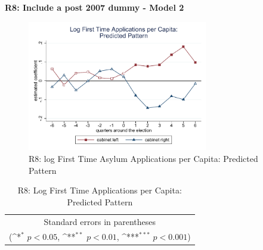 \documentclass[10pt,a4paper]{scrartcl}
\begin{document}
\clearpage
\textbf{R8: Include a post 2007 dummy - Model 2}
\begin{figure}[!ht]
	\centering
	\includegraphics[width=0.7\textwidth]{figures_edited/app_graph2_R8.pdf}
	\caption{R8: log First Time Asylum Applications per Capita: Predicted Pattern}
\end{figure}

\begin{table}[!ht]\centering
	\footnotesize
	\renewcommand{\arraystretch}{1.2}
	\def\sym#1{\ifmmode^{#1}\else\(^{#1}\)\fi}
	\caption{R8: Log First Time Applications per Capita: Predicted Pattern}
	\begin{tabular}{l*{2}{c}}
		\hline\hline
		
		\hline\hline
		\multicolumn{3}{c}{\footnotesize Standard errors in parentheses} \\
		\multicolumn{3}{c}{\footnotesize (\sym{*} \(p<0.05\), \sym{**} \(p<0.01\), \sym{***} \(p<0.001\))} \\
	\end{tabular}
\end{table}




\clearpage
\FloatBarrier
\end{document}
